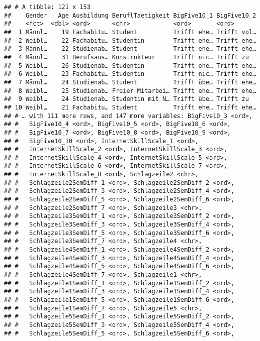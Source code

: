 \documentclass[]{article}
\begin{document}
\begin{verbatim}
## # A tibble: 121 x 153
##    Gender   Age Ausbildung BeruflTaetigkeit BigFive10_1 BigFive10_2
##    <fct>  <dbl> <ord>      <chr>            <ord>       <ord>      
##  1 Männl…    19 Fachabitu… Student          Trifft ehe… Trifft vol…
##  2 Weibl…    22 Fachabitu… Studentin        Trifft ehe… Trifft ehe…
##  3 Männl…    22 Studienab… Student          Trifft ehe… Trifft ehe…
##  4 Männl…    31 Berufsaus… Konstrukteur     Trifft nic… Trifft zu  
##  5 Weibl…    26 Studienab… Studentin        Trifft ehe… Trifft ehe…
##  6 Weibl…    23 Fachabitu… Studentin        Trifft nic… Trifft ehe…
##  7 Männl…    24 Studienab… Student          Trifft übe… Trifft ehe…
##  8 Weibl…    25 Studienab… Freier Mitarbei… Trifft ehe… Trifft ehe…
##  9 Weibl…    24 Studienab… Studentin mit N… Trifft übe… Trifft zu  
## 10 Weibl…    21 Fachabitu… Student          Trifft ehe… Trifft ehe…
## # … with 111 more rows, and 147 more variables: BigFive10_3 <ord>,
## #   BigFive10_4 <ord>, BigFive10_5 <ord>, BigFive10_6 <ord>,
## #   BigFive10_7 <ord>, BigFive10_8 <ord>, BigFive10_9 <ord>,
## #   BigFive10_10 <ord>, InternetSkillScale_1 <ord>,
## #   InternetSkillScale_2 <ord>, InternetSkillScale_3 <ord>,
## #   InternetSkillScale_4 <ord>, InternetSkillScale_5 <ord>,
## #   InternetSkillScale_6 <ord>, InternetSkillScale_7 <ord>,
## #   InternetSkillScale_8 <ord>, Schlagzeile2 <chr>,
## #   Schlagzeile2SemDiff_1 <ord>, Schlagzeile2SemDiff_2 <ord>,
## #   Schlagzeile2SemDiff_3 <ord>, Schlagzeile2SemDiff_4 <ord>,
## #   Schlagzeile2SemDiff_5 <ord>, Schlagzeile2SemDiff_6 <ord>,
## #   Schlagzeile2SemDiff_7 <ord>, Schlagzeile3 <chr>,
## #   Schlagzeile3SemDiff_1 <ord>, Schlagzeile3SemDiff_2 <ord>,
## #   Schlagzeile3SemDiff_3 <ord>, Schlagzeile3SemDiff_4 <ord>,
## #   Schlagzeile3SemDiff_5 <ord>, Schlagzeile3SemDiff_6 <ord>,
## #   Schlagzeile3SemDiff_7 <ord>, Schlagzeile4 <chr>,
## #   Schlagzeile4SemDiff_1 <ord>, Schlagzeile4SemDiff_2 <ord>,
## #   Schlagzeile4SemDiff_3 <ord>, Schlagzeile4SemDiff_4 <ord>,
## #   Schlagzeile4SemDiff_5 <ord>, Schlagzeile4SemDiff_6 <ord>,
## #   Schlagzeile4SemDiff_7 <ord>, Schlagzeile1 <chr>,
## #   Schlagzeile1SemDiff_1 <ord>, Schlagzeile1SemDiff_2 <ord>,
## #   Schlagzeile1SemDiff_3 <ord>, Schlagzeile1SemDiff_4 <ord>,
## #   Schlagzeile1SemDiff_5 <ord>, Schlagzeile1SemDiff_6 <ord>,
## #   Schlagzeile1SemDiff_7 <ord>, Schlagzeile5 <chr>,
## #   Schlagzeile5SemDiff_1 <ord>, Schlagzeile5SemDiff_2 <ord>,
## #   Schlagzeile5SemDiff_3 <ord>, Schlagzeile5SemDiff_4 <ord>,
## #   Schlagzeile5SemDiff_5 <ord>, Schlagzeile5SemDiff_6 <ord>,

\end{verbatim}
\end{document}
